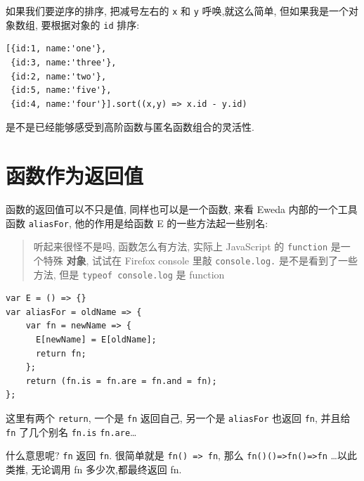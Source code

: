 \documentclass[a5paper]{book}
\begin{document}
如果我们要逆序的排序, 把减号左右的 \texttt{x} 和 \texttt{y} 呼唤,就这么简单,
但如果我是一个对象数组, 要根据对象的 \texttt{id} 排序:

\begin{verbatim}
[{id:1, name:'one'},
 {id:3, name:'three'}, 
 {id:2, name:'two'}, 
 {id:5, name:'five'},  
 {id:4, name:'four'}].sort((x,y) => x.id - y.id)
\end{verbatim}

是不是已经能够感受到高阶函数与匿名函数组合的灵活性.

\section{函数作为返回值}
\label{sec:orgheadline11}

函数的返回值可以不只是值, 同样也可以是一个函数, 来看 Eweda
内部的一个工具函数 \texttt{aliasFor}, 他的作用是给函数 E 的一些方法起一些别名:

\begin{quote}
听起来很怪不是吗, 函数怎么有方法, 实际上 JavaScript 的 \texttt{function}
是一个特殊 \textbf{对象}, 试试在 Firefox console 里敲 \texttt{console.log.}
是不是看到了一些方法, 但是 \texttt{typeof console.log} 是 function
\end{quote}

\begin{verbatim}
var E = () => {}
var aliasFor = oldName => {
    var fn = newName => {
      E[newName] = E[oldName];
      return fn;
    };
    return (fn.is = fn.are = fn.and = fn);
};
\end{verbatim}

这里有两个 \texttt{return}, 一个是 \texttt{fn} 返回自己, 另一个是 \texttt{aliasFor} 也返回
\texttt{fn}, 并且给 \texttt{fn} 了几个别名 \texttt{fn.is} \texttt{fn.are}\ldots{}

什么意思呢? \texttt{fn} 返回 \texttt{fn}. 很简单就是 \texttt{fn() => fn},
那么 \texttt{fn()()=>fn()=>fn} \ldots{}以此类推, 无论调用 fn 多少次,都最终返回 fn.
\end{document}
